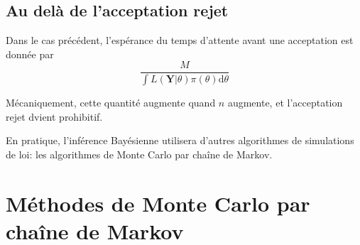 \documentclass[]{article}
\begin{document}
\hypertarget{au-deluxe0-de-lacceptation-rejet}{%
\subsection{Au delà de l'acceptation
rejet}\label{au-deluxe0-de-lacceptation-rejet}}

Dans le cas précédent, l'espérance du temps d'attente avant une
acceptation est donnée par
\[\frac{M}{\int L(\mathbf{Y}\vert \theta)\pi(\theta) \text{d}\theta}\]

Mécaniquement, cette quantité augmente quand \(n\) augmente, et
l'acceptation rejet dvient prohibitif.

En pratique, l'inférence Bayésienne utilisera d'autres algorithmes de
simulations de loi: les algorithmes de Monte Carlo par chaîne de Markov.

\newpage

\hypertarget{muxe9thodes-de-monte-carlo-par-chauxeene-de-markov}{%
\section{Méthodes de Monte Carlo par chaîne de
Markov}\label{muxe9thodes-de-monte-carlo-par-chauxeene-de-markov}}



\newpage



\end{document}
